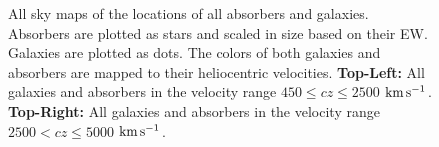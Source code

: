 \documentclass[twocolumn,tighten]{aastex62}
\newcommand{\kms}{$\rm km\, s^{-1}$}
\begin{document}
\begin{figure}
\centering
  \caption{\small{All sky maps of the locations of all absorbers and galaxies. Absorbers are plotted as stars and scaled in size based on their EW. Galaxies are plotted as dots. The colors of both galaxies and absorbers are mapped to their heliocentric velocities. \textbf{Top-Left:} All galaxies and absorbers in the velocity range $450 \leq cz \leq 2500$ \kms. \textbf{Top-Right:} All galaxies and absorbers in the velocity range $2500 < cz \leq 5000$ \kms.}}
\vspace{0pt}
\end{figure}
\end{document}
